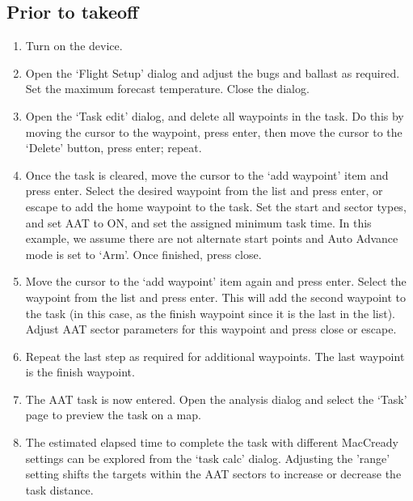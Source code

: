 \documentclass[a4paper,12pt]{refrep}
\begin{document}
\subsection*{Prior to takeoff}
\begin{enumerate}
\item Turn on the device.
\item Open the `Flight Setup' dialog and adjust the bugs and ballast as
required. Set the maximum forecast temperature.  Close the dialog.
\item Open the `Task edit' dialog, and delete all waypoints in the task.  Do this by moving the cursor to the waypoint, press enter, then move the cursor to the `Delete' button, press enter; repeat.
\item Once the task is cleared, move the cursor to the `add waypoint' item
and press enter.  Select the desired waypoint from the list and press
enter, or escape to add the home waypoint to the task.  Set the start
and sector types, and set AAT to ON, and set the assigned minimum task
time.  In this example, we assume there are not alternate start points
and Auto Advance mode is set to `Arm'.  Once finished, press close.
\item Move the cursor to the `add waypoint' item again and press enter.  Select the waypoint from the list and press enter.  This will add the second waypoint to the task (in this case, as the finish waypoint since it is the last in the list).  Adjust AAT sector parameters for this waypoint and press close or escape.
\item Repeat the last step as required for additional waypoints.  The last waypoint is the finish waypoint.
\item The AAT task is now entered.  Open the analysis dialog and select the `Task' page to preview the task on a map.
\item The estimated elapsed time to complete the task with different MacCready settings can be explored from the `task calc' dialog.  Adjusting the 'range'
setting shifts the targets within the AAT sectors to increase or
decrease the task distance.
\end{enumerate}
\end{document}
